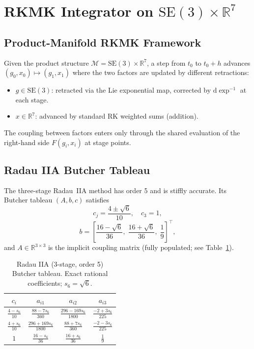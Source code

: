 \documentclass[a4paper,10pt]{article}
\newcommand{\SE}{\mathrm{SE}(3)}
\newcommand{\dexp}{\mathrm{d}\exp}
\newcommand{\R}{\mathbb{R}}
\theoremstyle{definition}
\begin{document}
\section{RKMK Integrator on $\SE \times \R^7$}
\label{sec:rkmk}

\subsection{Product-Manifold RKMK Framework}

Given the product structure $\mathcal{M} = \SE \times \R^7$, a step from
$t_0$ to $t_0 + h$ advances $(g_0, x_0) \mapsto (g_1, x_1)$ where the two
factors are updated by different retractions:

\begin{itemize}
  \item $g \in \SE$: retracted via the Lie exponential map, corrected by
    $\dexp^{-1}$ at each stage.
  \item $x \in \R^7$: advanced by standard RK weighted sums (addition).
\end{itemize}

The coupling between factors enters only through the shared evaluation of the
right-hand side $F(g_i, x_i)$ at stage points.

\subsection{Radau IIA Butcher Tableau}

The three-stage Radau~IIA method has order 5 and is stiffly accurate.  Its
Butcher tableau $(A, b, c)$ satisfies
\begin{equation}
  c_j = \frac{4 \pm \sqrt{6}}{10},\quad c_3 = 1,
  \label{eq:radau_c}
\end{equation}
\begin{equation}
  b = \left[\frac{16-\sqrt{6}}{36},\; \frac{16+\sqrt{6}}{36},\; \frac{1}{9}\right]^\top,
\end{equation}
and $A \in \R^{3 \times 3}$ is the implicit coupling matrix (fully populated;
see Table~\ref{tab:radau_tableau}).

\begin{table}[h]
  \centering
  \caption{Radau IIA (3-stage, order 5) Butcher tableau.  Exact rational
    coefficients; $s_6 = \sqrt{6}$.}
  \label{tab:radau_tableau}
  \small
  \begin{tabular}{c|ccc}
    \toprule
    $c_i$ & $a_{i1}$ & $a_{i2}$ & $a_{i3}$ \\
    \midrule
    $\tfrac{4-s_6}{10}$ &
      $\tfrac{88-7s_6}{360}$ &
      $\tfrac{296-169s_6}{1800}$ &
      $\tfrac{-2+3s_6}{225}$ \\[4pt]
    $\tfrac{4+s_6}{10}$ &
      $\tfrac{296+169s_6}{1800}$ &
      $\tfrac{88+7s_6}{360}$ &
      $\tfrac{-2-3s_6}{225}$ \\[4pt]
    $1$ &
      $\tfrac{16-s_6}{36}$ &
      $\tfrac{16+s_6}{36}$ &
      $\tfrac{1}{9}$ \\
    \bottomrule
  \end{tabular}
\end{table}
\end{document}
